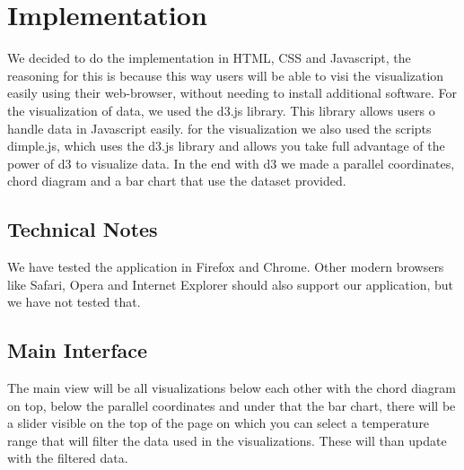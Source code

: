 \documentclass[a4paper,twoside,11pt]{article}
\begin{document}
\section{Implementation}
We decided to do the implementation in HTML, CSS and Javascript, the reasoning for this is because this way users will be able to visi the visualization easily using their web-browser, without needing to install additional software. \newline
For the visualization of data, we used the d3.js library. This library allows users o handle data in Javascript easily. for the visualization we also used the scripts dimple.js, which uses the d3.js library and allows you take full advantage of the power of d3 to visualize data. In the end with d3 we made a parallel coordinates, chord diagram and a bar chart that use the dataset provided.
\subsection{Technical Notes}
We have tested the application in Firefox and Chrome. Other modern browsers like Safari, Opera and Internet Explorer should also support our application, but we have not tested that.
\subsection{Main Interface}
The main view will be all visualizations below each other with the chord diagram on top, below the parallel coordinates and under that the bar chart, there will be a slider visible on the top of the page on which you can select a temperature range that will filter the data used in the visualizations. These will than update with the filtered data.
\newpage
\end{document}
